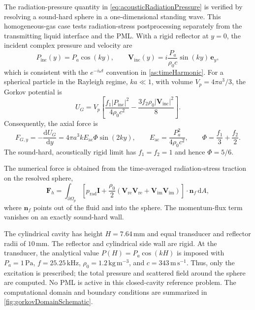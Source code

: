 \documentclass[final,12pt,nopreprintline,longtitle]{elsarticle}
\newcommand{\V}{\mathbf{V}}
\begin{document}
The radiation-pressure quantity in \cref{eq:acousticRadiationPressure} is
verified by resolving a sound-hard sphere in a one-dimensional standing wave.
This homogeneous-gas case tests radiation-stress postprocessing separately
from the transmitting liquid interface and the PML.
With a rigid reflector at $y=0$, the incident complex pressure and velocity are
\begin{equation}
    P_{\mathrm{inc}}(y)=P_a\cos(ky),
    \qquad
    \V_{\mathrm{inc}}(y)=
    i\frac{P_a}{\rho_0c}\sin(ky)\,\mathbf e_y,
    \label{eq:gorkovStandingWave}
\end{equation}
which is consistent with the $e^{-i\omega t}$ convention in
\cref{as:timeHarmonic}.  For a spherical particle in the Rayleigh regime,
$ka\ll1$, with volume $V_p=4\pi a^3/3$, the Gorkov potential is
\cite{gorkov1962potential}
\begin{equation}
    U_G=V_p\left[
        \frac{f_1|P_{\mathrm{inc}}|^2}{4\rho_0c^2}
        -\frac{3f_2\rho_0|\V_{\mathrm{inc}}|^2}{8}
    \right].
    \label{eq:gorkovPotential}
\end{equation}
Consequently, the axial force is
\begin{equation}
    F_{G,y}=-\frac{\mathrm dU_G}{\mathrm dy}
    =4\pi a^3kE_{\mathrm{ac}}\Phi\sin(2ky),
    \qquad
    E_{\mathrm{ac}}=\frac{P_a^2}{4\rho_0c^2},
    \qquad
    \Phi=\frac{f_1}{3}+\frac{f_2}{2}.
    \label{eq:gorkovForce}
\end{equation}
The sound-hard, acoustically rigid limit has $f_1=f_2=1$ and hence
$\Phi=5/6$.

The numerical force is obtained from the time-averaged radiation-stress
traction on the resolved sphere,
\begin{equation}
    \mathbf F_h=
    \int_{\partial\Omega_p}
    \left[
        p_{\mathrm{rad}}\mathbf I
        +\frac{\rho_0}{2}
        \left(
            \V_{\mathrm{re}}\V_{\mathrm{re}}
            +\V_{\mathrm{im}}\V_{\mathrm{im}}
        \right)
    \right]\cdot\mathbf n_f\,\mathrm dA,
    \label{eq:resolvedRadiationForce}
\end{equation}
where $\mathbf n_f$ points out of the fluid and into the sphere.  The
momentum-flux term vanishes on an exactly sound-hard wall.

The cylindrical cavity has height $H=7.64\,\mathrm{mm}$ and equal transducer
and reflector radii of $10\,\mathrm{mm}$.  The reflector and cylindrical side
wall are rigid.  At the transducer, the analytical value
$P(H)=P_a\cos(kH)$ is imposed with $P_a=1\,\mathrm{Pa}$,
$f=25.25\,\mathrm{kHz}$, $\rho_0=1.2\,\mathrm{kg\,m^{-3}}$, and
$c=343\,\mathrm{m\,s^{-1}}$.  Thus, only the excitation is prescribed; the
total pressure and scattered field around the sphere are computed.  No PML is
active in this closed-cavity reference problem.  The computational domain and
boundary conditions are summarized in \cref{fig:gorkovDomainSchematic}.
\end{document}

